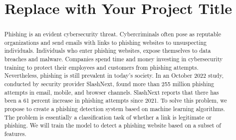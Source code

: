\documentclass[conference]{IEEEtran}
\begin{document}
\title{Replace with Your Project Title}

\author{
\and
{}
\and
{}
}

\maketitle


\begin{abstract}
Phishing is an evident cybersecurity threat. Cybercriminals often pose as reputable organizations and send emails with links to phishing websites to unsuspecting individuals. Individuals who enter phishing websites, expose themselves to data breaches and malware. Companies spend time and money investing in cybersecurity training to protect their employees and customers from phishing attempts. Nevertheless, phishing is still prevalent in today’s society. In an October 2022 study, conducted by security provider SlashNext, found more than 255 million phishing attempts in email, mobile, and browser channels. SlashNext reports that there has been a 61 percent increase in phishing attempts since 2021. To solve this problem, we propose to create a phishing detection system based on machine learning algorithms. The problem is essentially a classification task of whether a link is legitimate or phishing. We will train the model to detect a phishing website based on a subset of features. 
\end{abstract}
\end{document}
